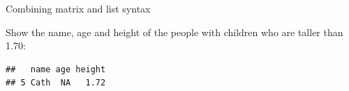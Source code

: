 \documentclass[ignorenonframetext,]{beamer}
\newenvironment{Shaded}{\begin{snugshade}}{\end{snugshade}}
\newcommand{\FloatTok}[1]{\textcolor[rgb]{0.00,0.00,0.81}{#1}}
\newcommand{\KeywordTok}[1]{\textcolor[rgb]{0.13,0.29,0.53}{\textbf{#1}}}
\newcommand{\NormalTok}[1]{#1}
\newcommand{\OperatorTok}[1]{\textcolor[rgb]{0.81,0.36,0.00}{\textbf{#1}}}
\newcommand{\OtherTok}[1]{\textcolor[rgb]{0.56,0.35,0.01}{#1}}
\newcommand{\StringTok}[1]{\textcolor[rgb]{0.31,0.60,0.02}{#1}}
\begin{document}
\begin{frame}[fragile]{Combining matrix and list syntax}
\protect\hypertarget{combining-matrix-and-list-syntax-3}{}

Show the name, age and height of the people with children who are taller
than 1.70:

\begin{Shaded}
\end{Shaded}

\begin{verbatim}
##   name age height
## 5 Cath  NA   1.72
\end{verbatim}

\end{frame}
\end{document}
